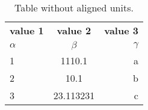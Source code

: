 \documentclass{article}
\begin{document}
	\begin{table}[h!]
		\begin{center}
			\caption{Table without aligned units.}
			\label{tab:table}
			\begin{tabular}{l|c|r}
			\textbf{value 1} & \textbf{value 2} &
			\textbf{value 3}\\
			$\alpha$ & $\beta$ & $\gamma$ \\
			\hline
			1 & 1110.1 & a\\ 
			2 & 10.1 & b\\
			3 & 23.113231 & c\\
			\end{tabular}
		\end{center}
	\end{table}
\end{document}
